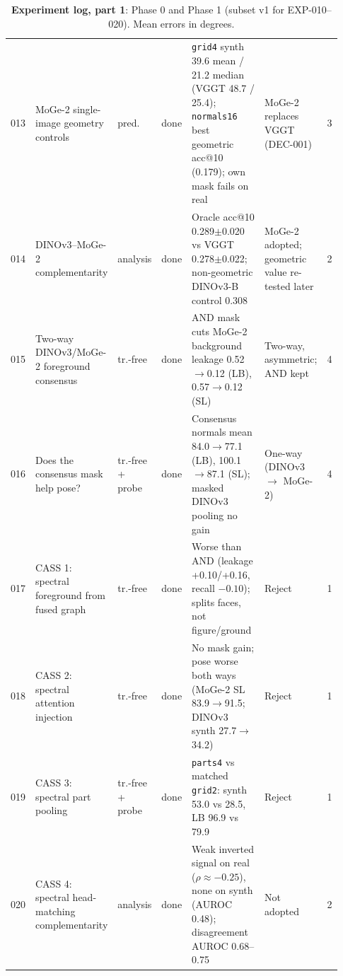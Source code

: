 \begin{table}[p]
\begin{tabular}{@{}p{0.05\linewidth}p{0.19\linewidth}p{0.085\linewidth}p{0.075\linewidth}p{0.305\linewidth}p{0.17\linewidth}p{0.05\linewidth}@{}}
    013 & MoGe-2 single-image geometry controls & pred. & done & \texttt{grid4} synth 39.6 mean / 21.2 median (VGGT 48.7 / 25.4); \texttt{normals16} best geometric acc@10 (0.179); own mask fails on real & MoGe-2 replaces VGGT (DEC-001) & 3 \\
    014 & DINOv3--MoGe-2 complementarity & analysis & done & Oracle acc@10 0.289$\pm$0.020 vs VGGT 0.278$\pm$0.022; non-geometric DINOv3-B control 0.308 & MoGe-2 adopted; geometric value re-tested later & 2 \\
    015 & Two-way DINOv3/MoGe-2 foreground consensus & tr.-free & done & AND mask cuts MoGe-2 background leakage 0.52$\to$0.12 (LB), 0.57$\to$0.12 (SL) & Two-way, asymmetric; AND kept & 4 \\
    016 & Does the consensus mask help pose? & tr.-free + probe & done & Consensus normals mean 84.0$\to$77.1 (LB), 100.1$\to$87.1 (SL); masked DINOv3 pooling no gain & One-way (DINOv3 $\to$ MoGe-2) & 4 \\
    017 & CASS 1: spectral foreground from fused graph & tr.-free & done & Worse than AND (leakage +0.10/+0.16, recall $-0.10$); splits faces, not figure/ground & Reject & 1 \\
    018 & CASS 2: spectral attention injection & tr.-free & done & No mask gain; pose worse both ways (MoGe-2 SL 83.9$\to$91.5; DINOv3 synth 27.7$\to$34.2) & Reject & 1 \\
    019 & CASS 3: spectral part pooling & tr.-free + probe & done & \texttt{parts4} vs matched \texttt{grid2}: synth 53.0 vs 28.5, LB 96.9 vs 79.9 & Reject & 1 \\
    020 & CASS 4: spectral head-matching complementarity & analysis & done & Weak inverted signal on real ($\rho\approx-0.25$), none on synth (AUROC 0.48); disagreement AUROC 0.68--0.75 & Not adopted & 2 \\
    \bottomrule
  \end{tabular}
  \caption{\textbf{Experiment log, part 1}: Phase 0 and Phase 1 (subset v1 for EXP-010--020). Mean errors in degrees.}
  \label{app:log_tab1}
\end{table}

